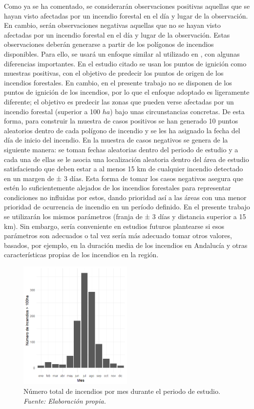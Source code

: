 \documentclass[12pt,a4paper,]{book}
\numberwithin{dummy}{section}
\theoremstyle{ocrenumbox}
\theoremstyle{blacknumex}
\theoremstyle{blacknumbox}
\theoremstyle{ocrenum}
\theoremstyle{ocrenum}
\begin{document}
Como ya se ha comentado, se considerarán observaciones positivas
aquellas que se hayan visto afectadas por un incendio forestal en el día
y lugar de la observación. En cambio, serán observaciones negativas
aquellas que no se hayan visto afectadas por un incendio forestal en el
día y lugar de la observación. Estas observaciones deberán generarse a
partir de los polígonos de incendios disponibles. Para ello, se usará un
enfoque similar al utilizado en \citep{stojanova2012estimating}, con
algunas diferencias importantes. En el estudio citado se usan los puntos
de ignición como muestras positivas, con el objetivo de predecir los
puntos de origen de los incendios forestales. En cambio, en el presente
trabajo no se disponen de los puntos de ignición de los incendios, por
lo que el enfoque adoptado es ligeramente diferente; el objetivo es
predecir las zonas que pueden verse afectadas por un incendio forestal
(superior a 100 \(ha\)) bajo unas circunstancias concretas. De esta
forma, para construir la muestra de casos positivos se han generado 10
puntos aleatorios dentro de cada polígono de incendio y se les ha
asignado la fecha del día de inicio del incendio. En
\citet{stojanova2012estimating} la muestra de casos negativos se genera
de la siguiente manera: se toman fechas aleatorias dentro del periodo de
estudio y a cada una de ellas se le asocia una localización aleatoria
dentro del área de estudio satisfaciendo que deben estar a al menos 15
km de cualquier incendio detectado en un margen de ± 3 días. Esta forma
de tomar los casos negativos asegura que estén lo suficientemente
alejados de los incendios forestales para representar condiciones no
influidas por estos, dando prioridad así a las áreas con una menor
prioridad de ocurrencia de incendio en un período definido. En el
presente trabajo se utilizarán los mismos parámetros (franja de ± 3 días
y distancia superior a 15 km). Sin embargo, sería conveniente en
estudios futuros plantearse si esos parámetros son adecuados o tal vez
sería más adecuado tomar otros valores, basados, por ejemplo, en la
duración media de los incendios en Andalucía y otras características
propias de los incendios en la región.

\begin{figure}[htb]
\centering
\includegraphics[width=0.5\textwidth]{graficos/incendios_mes.png}
\caption[Número total de incendios por mes durante el periodo de estudio]{Número total de incendios por mes durante el periodo de estudio. \it Fuente: Elaboración propia.}
\label{fig:incendios_mes}
\end{figure}
\end{document}
